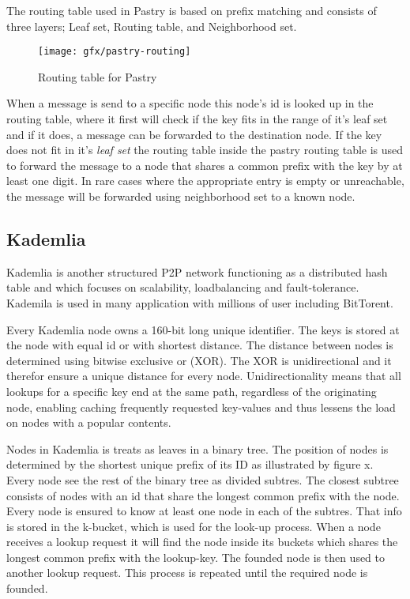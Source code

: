 The routing table used in Pastry is based on prefix matching and consists of three layers; Leaf set, Routing table, and Neighborhood set.\\
\begin{figure}[bth]
\texttt{[image: gfx/pastry-routing]}
\caption[routingtable]{Routing table for Pastry} \label{fig:pastryrouting}
\end{figure}
When a message is send to a specific node this node's id is looked up in the routing table, where it first will check if the key fits in the range of it's leaf set and if it does, a message can be forwarded to the destination node.
If the key does not fit in it's \emph{leaf set} the routing table inside the pastry routing table is used to forward the message to a node that shares a common prefix with the key by at least one digit.
In rare cases where the appropriate entry is empty or unreachable, the message will be forwarded using neighborhood set to a known node.


\subsection{Kademlia}
Kademlia is another structured P2P network functioning as a distributed hash table and which focuses on scalability, loadbalancing and fault-tolerance. Kademila is used in many application with millions of user including BitTorent.

Every Kademlia node owns a 160-bit long unique identifier. The keys is stored at the node with equal id or with shortest distance.
The distance between nodes is determined using bitwise exclusive or (XOR). The XOR is unidirectional and it therefor ensure a unique distance for every node. Unidirectionality means that all lookups for a specific key end at the same path, regardless of the originating node, enabling caching frequently requested key-values and thus lessens the load on nodes with a popular contents.

Nodes in Kademlia is treats as leaves in a binary tree. The position of nodes is determined by the shortest unique prefix of its ID as illustrated by figure x. Every node see the rest of the binary tree as divided subtres. The closest subtree consists of nodes with an id that share the longest common prefix with the node. Every node is ensured to know at least one node in each of the subtres. That info is stored in the k-bucket, which is used for the look-up process. When a node receives a lookup request it will find the node inside its buckets which shares the longest common prefix with the lookup-key. The founded node is then used to another lookup request. This process is repeated until the required node is founded.

